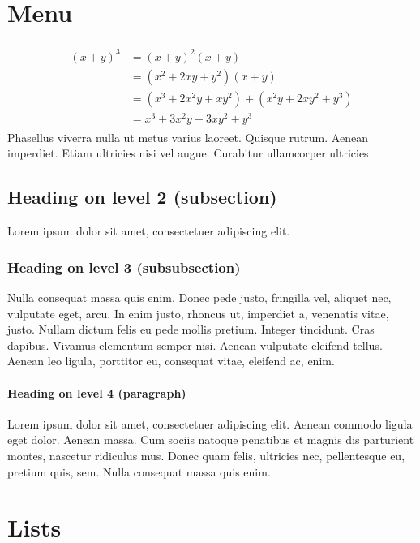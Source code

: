 \documentclass[paper=a4, fontsize=11pt]{scrartcl}
\numberwithin{equation}{section}		%
\numberwithin{figure}{section}			%
\numberwithin{table}{section}				%
\begin{document}
\section{Menu}


\begin{align} 
	\begin{split}
	(x+y)^3 	&= (x+y)^2(x+y)\\
					&=(x^2+2xy+y^2)(x+y)\\
					&=(x^3+2x^2y+xy^2) + (x^2y+2xy^2+y^3)\\
					&=x^3+3x^2y+3xy^2+y^3
	\end{split}					
\end{align}
Phasellus viverra nulla ut metus varius laoreet. Quisque rutrum. Aenean imperdiet. Etiam ultricies nisi vel augue. Curabitur ullamcorper ultricies 

\subsection{Heading on level 2 (subsection)}
Lorem ipsum dolor sit amet, consectetuer adipiscing elit. 

\subsubsection{Heading on level 3 (subsubsection)}
Nulla consequat massa quis enim. Donec pede justo, fringilla vel, aliquet nec, vulputate eget, arcu. In enim justo, rhoncus ut, imperdiet a, venenatis vitae, justo. Nullam dictum felis eu pede mollis pretium. Integer tincidunt. Cras dapibus. Vivamus elementum semper nisi. Aenean vulputate eleifend tellus. Aenean leo ligula, porttitor eu, consequat vitae, eleifend ac, enim.

\paragraph{Heading on level 4 (paragraph)}
Lorem ipsum dolor sit amet, consectetuer adipiscing elit. Aenean commodo ligula eget dolor. Aenean massa. Cum sociis natoque penatibus et magnis dis parturient montes, nascetur ridiculus mus. Donec quam felis, ultricies nec, pellentesque eu, pretium quis, sem. Nulla consequat massa quis enim. 


\section{Lists}
\end{document}
